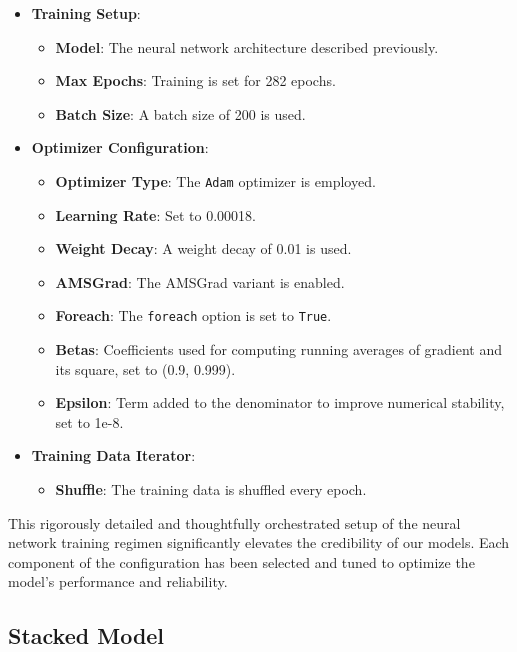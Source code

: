 \documentclass{article}
\begin{document}
\begin{itemize}
    \item \textbf{Training Setup}:
      \begin{itemize}
        \item \textbf{Model}: The neural network architecture described previously.
        \item \textbf{Max Epochs}: Training is set for 282 epochs.
        \item \textbf{Batch Size}: A batch size of 200 is used.
      \end{itemize}

    \item \textbf{Optimizer Configuration}:
    
      \begin{itemize}
        \item \textbf{Optimizer Type}: The \texttt{Adam} optimizer is employed.
        \item \textbf{Learning Rate}: Set to 0.00018.
        \item \textbf{Weight Decay}: A weight decay of 0.01 is used.
        \item \textbf{AMSGrad}: The AMSGrad variant is enabled.
        \item \textbf{Foreach}: The \texttt{foreach} option is set to \texttt{True}.
        \item \textbf{Betas}: Coefficients used for computing running averages of gradient and its square, set to (0.9, 0.999).
        \item \textbf{Epsilon}: Term added to the denominator to improve numerical stability, set to 1e-8.
      \end{itemize}

    \item \textbf{Training Data Iterator}:
      \begin{itemize}
        \item \textbf{Shuffle}: The training data is shuffled every epoch.
      \end{itemize}
\end{itemize}

This rigorously detailed and thoughtfully orchestrated setup of the neural network training regimen significantly elevates the credibility of our models. Each component of the configuration has been selected and tuned to optimize the model's performance and reliability.

\subsection{Stacked Model}
\end{document}
